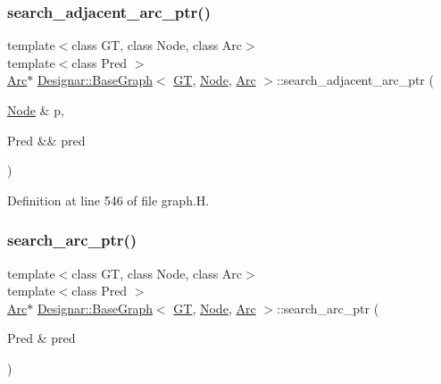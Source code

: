 \subsubsection{\texorpdfstring{search\+\_\+adjacent\+\_\+arc\+\_\+ptr()}{search\_adjacent\_arc\_ptr()}\hspace{0.1cm}{\footnotesize\ttfamily [2/2]}}
{\footnotesize\ttfamily template$<$class GT, class Node, class Arc$>$ \\
template$<$class Pred $>$ \\
\hyperlink{namespace_designar_a3f55fb5513d62ff47cbc8f72b8e95d6f}{Arc}$\ast$ \hyperlink{class_designar_1_1_base_graph}{Designar\+::\+Base\+Graph}$<$ \hyperlink{demo-buildgraph_8_c_a3001c40d2c31ca87ed96cd7d1334a55e}{GT}, \hyperlink{namespace_designar_a5af326c65aa2bd26b26c410f2030d09e}{Node}, \hyperlink{namespace_designar_a3f55fb5513d62ff47cbc8f72b8e95d6f}{Arc} $>$\+::search\+\_\+adjacent\+\_\+arc\+\_\+ptr (\begin{DoxyParamCaption}\item[{\hyperlink{namespace_designar_a5af326c65aa2bd26b26c410f2030d09e}{Node} \&}]{p,  }\item[{Pred \&\&}]{pred }\end{DoxyParamCaption})\hspace{0.3cm}{\ttfamily [inline]}}



Definition at line 546 of file graph.\+H.

\mbox{\label{class_designar_1_1_base_graph_afcbc602350567bc5a377fd7fc94419ae}} 
\subsubsection{\texorpdfstring{search\+\_\+arc\+\_\+ptr()}{search\_arc\_ptr()}\hspace{0.1cm}{\footnotesize\ttfamily [1/2]}}
{\footnotesize\ttfamily template$<$class GT, class Node, class Arc$>$ \\
template$<$class Pred $>$ \\
\hyperlink{namespace_designar_a3f55fb5513d62ff47cbc8f72b8e95d6f}{Arc}$\ast$ \hyperlink{class_designar_1_1_base_graph}{Designar\+::\+Base\+Graph}$<$ \hyperlink{demo-buildgraph_8_c_a3001c40d2c31ca87ed96cd7d1334a55e}{GT}, \hyperlink{namespace_designar_a5af326c65aa2bd26b26c410f2030d09e}{Node}, \hyperlink{namespace_designar_a3f55fb5513d62ff47cbc8f72b8e95d6f}{Arc} $>$\+::search\+\_\+arc\+\_\+ptr (\begin{DoxyParamCaption}\item[{Pred \&}]{pred }\end{DoxyParamCaption})\hspace{0.3cm}{\ttfamily [inline]}}



